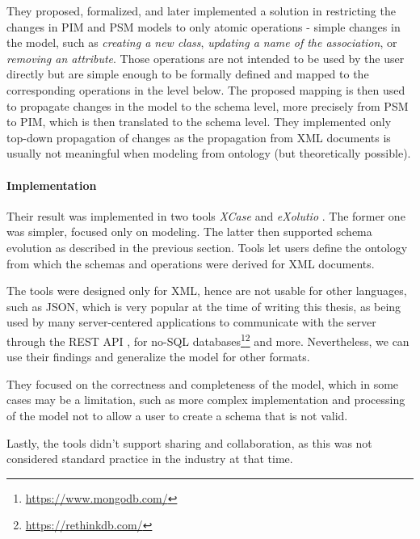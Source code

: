 They proposed, formalized, and later implemented a solution in restricting the changes in PIM and PSM models to only atomic operations - simple changes in the model, such as \textit{creating a new class}, \textit{updating a name of the association}, or \textit{removing an attribute}. Those operations are not intended to be used by the user directly but are simple enough to be formally defined and mapped to the corresponding operations in the level below. The proposed mapping is then used to propagate changes in the model to the schema level, more precisely from PSM to PIM, which is then translated to the schema level. They implemented only top-down propagation of changes as the propagation from XML documents is usually not meaningful when modeling from ontology (but theoretically possible).

\paragraph{Implementation} Their result was implemented in two tools \textit{XCase} \cite{xcase} and \textit{eXolutio} \cite{exolutio}. The former one was simpler, focused only on modeling. The latter then supported schema evolution as described in the previous section. Tools let users define the ontology from which the schemas and operations were derived for XML documents.

\bigskip

The tools were designed only for XML, hence are not usable for other languages, such as JSON, which is very popular at the time of writing this thesis, as being used by many server-centered applications to communicate with the server through the REST API \cite{fielding2000architectural}, for no-SQL databases\footnote{\url{https://www.mongodb.com/}}\footnote{\url{https://rethinkdb.com/}} and more. Nevertheless, we can use their findings and generalize the model for other formats.

They focused on the correctness and completeness of the model, which in some cases may be a limitation, such as more complex implementation and processing of the model not to allow a user to create a schema that is not valid.

Lastly, the tools didn't support sharing and collaboration, as this was not considered standard practice in the industry at that time.